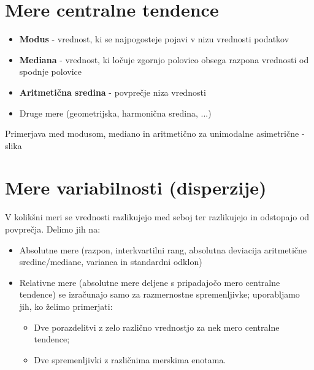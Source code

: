 \section{Mere centralne tendence}
\begin{itemize}
    \item \textbf{Modus} - vrednost, ki se najpogosteje pojavi v nizu vrednosti podatkov
    \item \textbf{Mediana} - vrednost, ki ločuje zgornjo polovico obsega razpona vrednosti od spodnje polovice
    \item \textbf{Aritmetična sredina} - povprečje niza vrednosti
    \item Druge mere (geometrijska, harmonična sredina, ...)
\end{itemize}
Primerjava med modusom, mediano in aritmetično za unimodalne asimetrične - slika

\section{Mere variabilnosti (disperzije)}
V kolikšni meri se vrednosti razlikujejo med seboj ter razlikujejo in odstopajo od povprečja. Delimo jih na:
\begin{itemize}
    \item Absolutne mere (razpon, interkvartilni rang, absolutna deviacija aritmetične sredine/mediane, varianca in standardni odklon) 
    \item Relativne mere (absolutne mere deljene s pripadajočo mero centralne tendence) se izračunajo samo za razmernostne spremenljivke; uporabljamo jih, ko želimo primerjati:
    \begin{itemize}
        \item Dve porazdelitvi z zelo različno vrednostjo za nek mero centralne tendence;
        \item Dve spremenljivki z različnima merskima enotama.
    \end{itemize}
\end{itemize}

